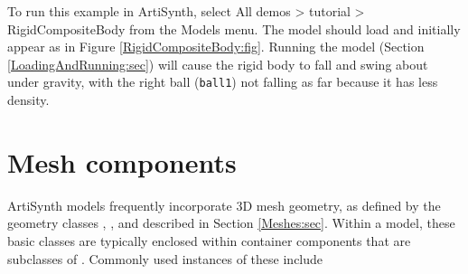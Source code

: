 To run this example in ArtiSynth, select {\sf All demos > tutorial >
RigidCompositeBody} from the {\sf Models} menu. The model should load
and initially appear as in Figure \ref{RigidCompositeBody:fig}.
Running the model (Section \ref{LoadingAndRunning:sec}) will cause the
rigid body to fall and swing about under gravity, with the right ball
({\tt ball1}) not falling as far because it has less density.

\section{Mesh components}
\label{MeshComponents:sec}

ArtiSynth models frequently incorporate 3D mesh geometry, as defined
by the geometry classes ,
, and
 described in Section
\ref{Meshes:sec}. Within a model, these basic classes are typically
enclosed within container components that are subclasses of
. Commonly
used instances of these include

